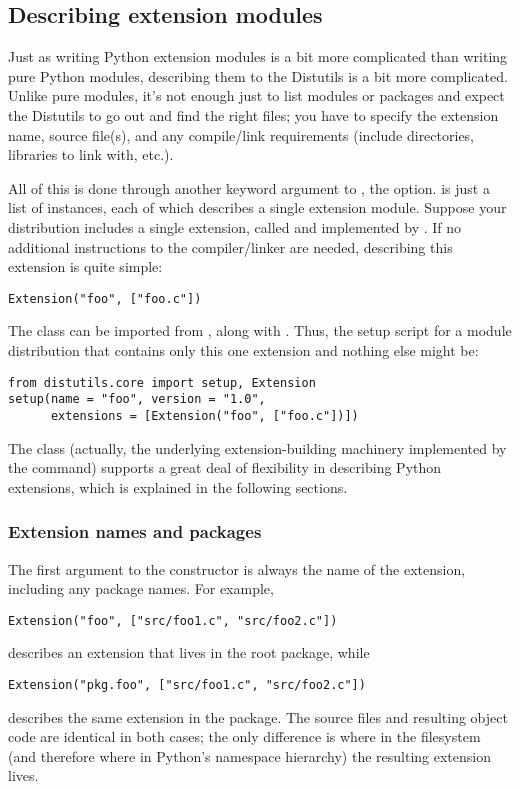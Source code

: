 \documentclass{howto}
\begin{document}
\subsection{Describing extension modules}
\label{describing-extensions}

Just as writing Python extension modules is a bit more complicated than
writing pure Python modules, describing them to the Distutils is a bit
more complicated.  Unlike pure modules, it's not enough just to list
modules or packages and expect the Distutils to go out and find the
right files; you have to specify the extension name, source file(s), and
any compile/link requirements (include directories, libraries to link
with, etc.).

All of this is done through another keyword argument to
, the  option.  
is just a list of  instances, each of which describes a
single extension module.  Suppose your distribution includes a single
extension, called  and implemented by .  If no
additional instructions to the compiler/linker are needed, describing
this extension is quite simple:
\begin{verbatim}
Extension("foo", ["foo.c"])
\end{verbatim}
The  class can be imported from
, along with .  Thus, the setup
script for a module distribution that contains only this one extension
and nothing else might be:
\begin{verbatim}
from distutils.core import setup, Extension
setup(name = "foo", version = "1.0",
      extensions = [Extension("foo", ["foo.c"])])
\end{verbatim}

The  class (actually, the underlying extension-building
machinery implemented by the  command) supports a
great deal of flexibility in describing Python extensions, which is
explained in the following sections.  


\subsubsection{Extension names and packages}

The first argument to the  constructor is always the
name of the extension, including any package names.  For example,
\begin{verbatim}
Extension("foo", ["src/foo1.c", "src/foo2.c"])
\end{verbatim}
describes an extension that lives in the root package, while
\begin{verbatim}
Extension("pkg.foo", ["src/foo1.c", "src/foo2.c"])
\end{verbatim}
describes the same extension in the  package.  The source
files and resulting object code are identical in both cases; the only
difference is where in the filesystem (and therefore where in Python's
namespace hierarchy) the resulting extension lives.
\end{document}
